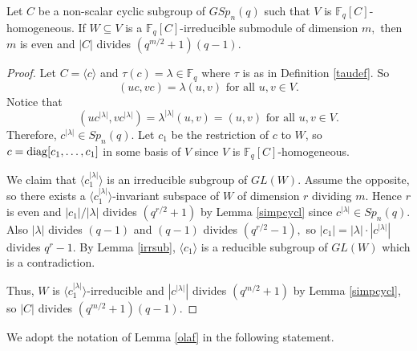 \begin{Cor}\label{simpcyclcor}
Let $C$ be a non-scalar cyclic subgroup of $GSp_{n}(q)$ such that $V$ is $\mathbb{F}_{q}[C]$-homogeneous.   If $W \subseteq V$ is a $\mathbb{F}_{q}[C]$-irreducible  submodule of dimension $m,$ then $m$ is even and $|C|$ divides $(q^{m/2}+1)(q-1).$
\end{Cor} 
\begin{proof}
Let  $C=\langle c \rangle$ and $\tau(c)=\lambda \in \mathbb{F}_q$ where $\tau$ is as in Definition \ref{taudef}. So
$$(uc,vc)=\lambda (u,v) \text{ for all } u,v \in V.$$ Notice that
$$(uc^{|\lambda|},vc^{|\lambda|})=\lambda^{|\lambda|} (u,v) =(u,v) \text{ for all } u,v \in V.$$
Therefore, $c^{|\lambda|} \in Sp_n(q).$ Let $c_1$ be the restriction of $c$ to $W$, so $c=\mathrm{diag}[c_1, \ldots, c_1]$ in some basis of $V$ since $V$ is $\mathbb{F}_q[C]$-homogeneous.  

We claim that $\langle c_1^{|\lambda|} \rangle$ is an irreducible subgroup of $GL(W).$ Assume the  opposite, so there exists a $\langle c_1^{|\lambda|} \rangle$-invariant subspace of $W$ of dimension $r$ dividing $m$. Hence $r$ is even and $|c_1|/{|\lambda|}$ divides $(q^{r/2}+1)$ by Lemma   \ref{simpcycl} since $c^{|\lambda|} \in Sp_n(q).$ Also $|\lambda|$ divides $(q-1)$ and $(q-1)$ divides $(q^{r/2}-1),$ so $|c_1|=|\lambda|\cdot|c^{|\lambda|}|$ divides $q^r-1.$ By Lemma \ref{irrsub}, $\langle c_1 \rangle$ is a reducible subgroup of $GL(W)$ which is a contradiction. 

Thus, $W$ is $\langle c_1^{|\lambda|} \rangle$-irreducible and $|c^{|\lambda|}|$ divides $(q^{m/2}+1)$ by Lemma \ref{simpcycl}, so $|C|$ divides $(q^{m/2}+1)(q-1).$
\end{proof}

We adopt the notation of Lemma \ref{olaf} in the following statement.

